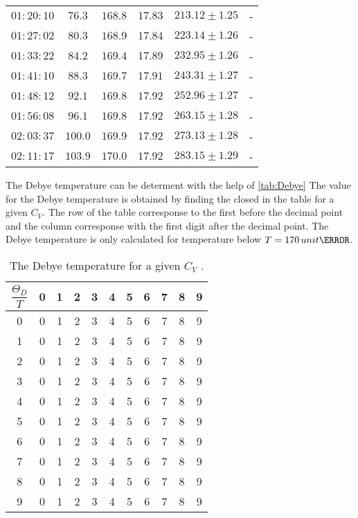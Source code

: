 \begin{table}[H]
\begin{tabular}{c c c c c c}
          $01:20:10$  &  $76.3$ &    $168.8$ &   $ 17.83$  & $213.12 \pm 1.25$&-                       \\    
          $01:27:02$  &  $80.3$ &    $168.9$ &   $ 17.84$  & $223.14 \pm 1.26$&-                       \\    
          $01:33:22$  &  $84.2$ &    $169.4$ &   $ 17.89$  & $232.95 \pm 1.26$&-                       \\    
          $01:41:10$  &  $88.3$ &    $169.7$ &   $ 17.91$  & $243.31 \pm 1.27$&-                       \\    
          $01:48:12$  &  $92.1$ &    $169.8$ &   $ 17.92$  & $252.96 \pm 1.27$&-                       \\    
          $01:56:08$  &  $96.1$ &    $169.8$ &   $ 17.92$  & $263.15 \pm 1.28$&-                       \\    
          $02:03:37$  &  $100.0$&    $169.9$ &   $ 17.92$  & $273.13 \pm 1.28$&-                       \\   
          $02:11:17$  &  $103.9$&    $170.0$ &   $ 17.92$  & $283.15 \pm 1.29$&-                       \\   
    \bottomrule
    \end{tabular}
    \end{table}


The Debye temperature can be determent with the help of \autoref{tab:Debye}
The value for the Debye temperature is obtained by finding the closed in the table for a given $C_V$.
The row of the table corresponse  to the first before the decimal point and the column corresponse
with the first digit after the decimal point. 
The Debye temperature is only calculated for temperature below $T = 170 \, unit{\kelvin}$.

\begin{table}[H]
\centering
\caption{The Debye temperature for a given $C_V$  \cite{v47}.}
\label{tab:Debye}
\begin{tabular}{c | c c c c c c c c c c}
\toprule
 $\dfrac{\Theta_D}{T} $ &0 & 1 & 2 &3 & 4 & 5&6 & 7 & 8 &9\\
\midrule
    0 & 0 & 1 & 2 & 3 & 4 & 5 & 6 & 7 & 8 & 9 \\
    1 & 0 & 1 & 2 & 3 & 4 & 5 & 6 & 7 & 8 & 9 \\
    2 & 0 & 1 & 2 & 3 & 4 & 5 & 6 & 7 & 8 & 9 \\
    3 & 0 & 1 & 2 & 3 & 4 & 5 & 6 & 7 & 8 & 9 \\
    4 & 0 & 1 & 2 & 3 & 4 & 5 & 6 & 7 & 8 & 9 \\
    5 & 0 & 1 & 2 & 3 & 4 & 5 & 6 & 7 & 8 & 9 \\
    6 & 0 & 1 & 2 & 3 & 4 & 5 & 6 & 7 & 8 & 9 \\
    7 & 0 & 1 & 2 & 3 & 4 & 5 & 6 & 7 & 8 & 9 \\
    8 & 0 & 1 & 2 & 3 & 4 & 5 & 6 & 7 & 8 & 9 \\
    9 & 0 & 1 & 2 & 3 & 4 & 5 & 6 & 7 & 8 & 9 \\
\bottomrule
\end{tabular}
\end{table}
